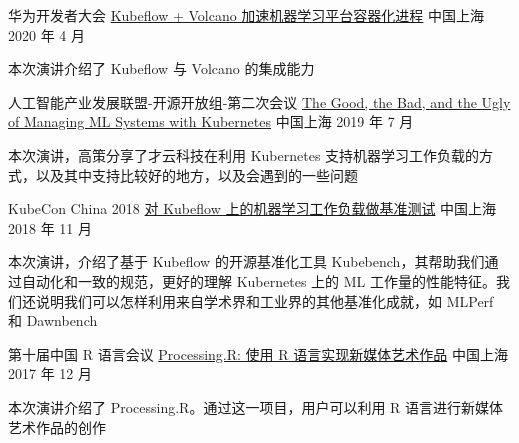 \begin{cventries}

  \cventry
    {华为开发者大会}
    {\href{https://docs.google.com/presentation/d/1GAkh0inBsZHC2XUNde0YCQ7W70r2rA7X5VWsGN1D6KU/edit}{Kubeflow + Volcano 加速机器学习平台容器化进程}}
    {中国上海} %
    {2020 年 4 月} %
    {
      \begin{cvitems} %
        \item {
          本次演讲介绍了 Kubeflow 与 Volcano 的集成能力
        }
      \end{cvitems}
    }

  \cventry
    {人工智能产业发展联盟-开源开放组-第二次会议}
    {\href{https://docs.google.com/presentation/d/1lVmPF7KRtxi9DhBeRi4uU2NALtqNFTS6NhlLeuPDsrs/edit}{The Good, the Bad, and the Ugly of Managing ML Systems with Kubernetes}}
    {中国上海} %
    {2019 年 7 月} %
    {
      \begin{cvitems} %
        \item {
          本次演讲，高策分享了才云科技在利用 Kubernetes 支持机器学习工作负载的方式，以及其中支持比较好的地方，以及会遇到的一些问题
        }
      \end{cvitems}
    }

  \cventry
    {KubeCon China 2018}
    {\href{http://sched.co/FvLV}{对 Kubeflow 上的机器学习工作负载做基准测试}}
    {中国上海} %
    {2018 年 11 月} %
    {
      \begin{cvitems} %
        \item {
          本次演讲，介绍了基于 Kubeflow 的开源基准化工具 Kubebench，其帮助我们通过自动化和一致的规范，更好的理解 Kubernetes 上的 ML 工作量的性能特征。我们还说明我们可以怎样利用来自学术界和工业界的其他基准化成就，如 MLPerf 和 Dawnbench
        }
      \end{cvitems}
    }

  \cventry
    {第十届中国 R 语言会议}
    {\href{http://slides.com/gaocegege/processing-r}{
      Processing.R: 使用 R 语言实现新媒体艺术作品}}
    {中国上海} %
    {2017 年 12 月} %
    {
      \begin{cvitems} %
        \item {
          本次演讲介绍了 Processing.R。通过这一项目，用户可以利用 R 语言进行新媒体艺术作品的创作
        }
      \end{cvitems}
    }

\end{cventries}

